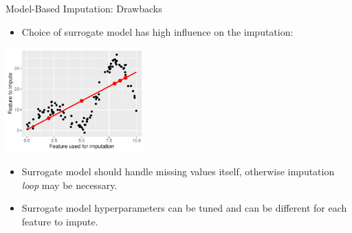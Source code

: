 \documentclass[11pt,compress,t,notes=noshow, xcolor=table]{beamer}
\begin{document}
\begin{frame}{Model-Based Imputation: Drawbacks}

    \begin{itemize}
        \item Choice of surrogate model has high influence on the imputation:
    \end{itemize}
    
    \begin{center}
        \includegraphics[width=0.4\textwidth]{figure/surrogate_model_influence}
    \end{center}
    
    \begin{itemize}
        \item Surrogate model should handle missing values itself, otherwise imputation \textit{loop} may be necessary.
        
        \item Surrogate model hyperparameters can be tuned and can be different for each feature to impute.
    \end{itemize}

\end{frame}





\end{document}
